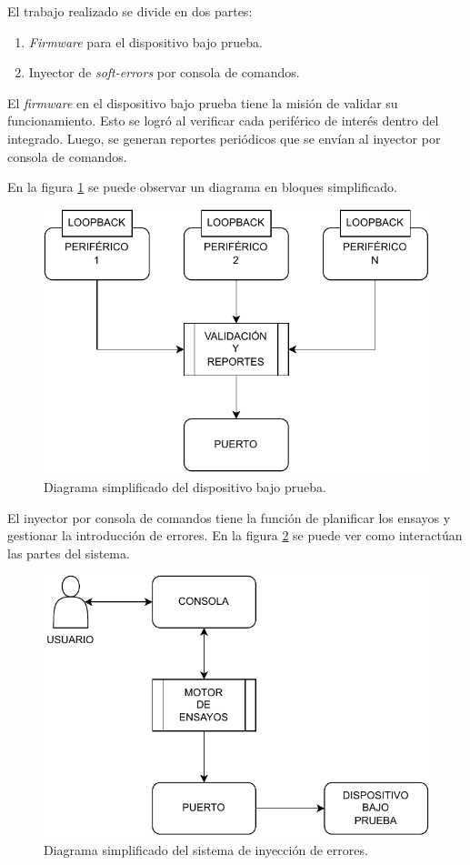 El trabajo realizado se divide en dos partes:
\begin{enumerate}
    \item \emph{Firmware} para el dispositivo bajo prueba.
    \item Inyector de \emph{soft-errors} por consola de comandos.
\end{enumerate}

El \emph{firmware} en el dispositivo bajo prueba tiene la misión de validar su funcionamiento.
Esto se logró al verificar cada periférico de interés dentro del integrado.
Luego, se generan reportes periódicos que se envían al inyector por consola de comandos.

En la figura \ref{fig:dutsimple} se puede observar un diagrama en bloques simplificado.

\begin{figure}[htbp]
	\centering
	\includegraphics[width=\textwidth]{./Figures/dutsimple.pdf}
    \caption{Diagrama simplificado del dispositivo bajo prueba.}
	\label{fig:dutsimple}
\end{figure}

El inyector por consola de comandos tiene la función de planificar los ensayos y gestionar la introducción de errores.
En la figura \ref{fig:sisesimple} se puede ver como interactúan las partes del sistema.

\begin{figure}[h!]
	\centering
	\includegraphics[width=\textwidth]{./Figures/sisesimple.pdf}
    \caption{Diagrama simplificado del sistema de inyección de errores.}
	\label{fig:sisesimple}
\end{figure}
\vspace*{3in}

